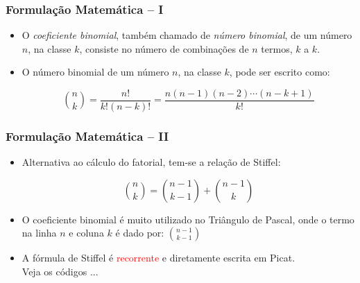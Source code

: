 
\begin{frame}[fragile]

\frametitle{Formulação Matemática -- I}

\begin{itemize}
  \item O \textit{coeficiente binomial}, também chamado de \textit{número binomial}, 
de um número $n$, na classe $k$, consiste no número de combinações de $n$ termos, $k$ a $k$. 

\pause
  \item O número binomial de um número $n$, na classe $k$, pode ser escrito como:

$$ {n \choose k}= \frac {n!}{k!(n-k)!}=\frac {n(n-1)(n-2)\cdots(n-k+1)}{k!}$$
\end{itemize}   
    
\end{frame}



\begin{frame}[fragile]

\frametitle{Formulação Matemática -- II}

\begin{itemize}
  \item Alternativa ao cálculo do fatorial, tem-se a relação de Stiffel:

 $$ {n\choose k}={n-1\choose k-1}+{n-1\choose k}$$  
    

\pause
  \item  O coeficiente binomial é muito utilizado no Triângulo de Pascal, onde o 
  termo na linha $n$ e coluna $k$ é  dado por: ${n-1 \choose k-1}$
  
  \pause
  \item A fórmula de Stiffel é \textcolor{red}{recorrente} e diretamente escrita em Picat.\\
  Veja os códigos ...
\end{itemize}   
    
\end{frame}


